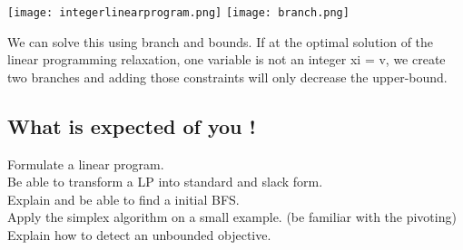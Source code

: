 \texttt{[image: integerlinearprogram.png]}
\texttt{[image: branch.png]}

We can solve this using branch and bounds. If at the optimal solution of
the linear programming relaxation, one variable is not an integer xi =
v, we create two branches and adding those constraints will only
decrease the upper-bound.

\subsection{What is expected of you !}
Formulate a linear program. \\
Be able to transform a LP into standard and slack form. \\
Explain and be able to find a initial BFS. \\
Apply the simplex algorithm on a small example. (be familiar with the pivoting)\\
Explain how to detect an unbounded objective.
